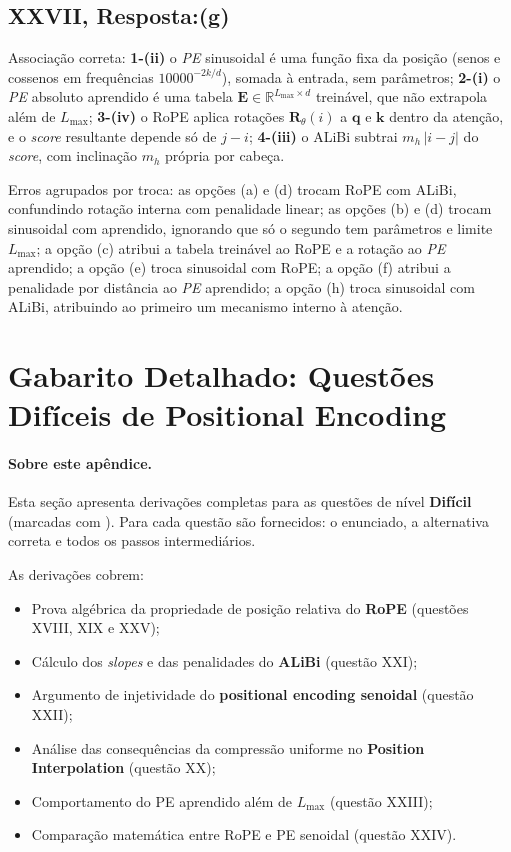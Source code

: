 \documentclass{dlproblemset}
\begin{document}
\subsection*{XXVII, Resposta:(g)}
Associação correta: \textbf{1-(ii)} o \textit{PE} sinusoidal é uma função fixa da
posição (senos e cossenos em frequências $10000^{-2k/d}$), somada à entrada, sem
parâmetros; \textbf{2-(i)} o \textit{PE} absoluto aprendido é uma tabela
$\mathbf{E} \in \mathbb{R}^{L_{\text{max}} \times d}$ treinável, que não extrapola além
de $L_{\text{max}}$; \textbf{3-(iv)} o RoPE aplica rotações $\mathbf{R}_\theta(i)$ a
$\mathbf{q}$ e $\mathbf{k}$ dentro da atenção, e o \textit{score} resultante depende só
de $j - i$; \textbf{4-(iii)} o ALiBi subtrai $m_h\,|i - j|$ do \textit{score}, com
inclinação $m_h$ própria por cabeça.

Erros agrupados por troca: as opções (a) e (d) trocam RoPE com ALiBi, confundindo
rotação interna com penalidade linear; as opções (b) e (d) trocam sinusoidal com
aprendido, ignorando que só o segundo tem parâmetros e limite $L_{\text{max}}$; a opção
(c) atribui a tabela treinável ao RoPE e a rotação ao \textit{PE} aprendido; a opção (e)
troca sinusoidal com RoPE; a opção (f) atribui a penalidade por distância ao
\textit{PE} aprendido; a opção (h) troca sinusoidal com ALiBi, atribuindo ao primeiro um
mecanismo interno à atenção.

\clearpage
\section*{Gabarito Detalhado: Questões Difíceis de Positional Encoding}

\paragraph{Sobre este apêndice.}
Esta seção apresenta derivações completas para as questões de nível \textbf{Difícil}
(marcadas com ).
Para cada questão são fornecidos: o enunciado, a alternativa correta e todos os
passos intermediários.

As derivações cobrem:
\begin{itemize}
  \item Prova algébrica da propriedade de posição relativa do \textbf{RoPE}
        (questões XVIII, XIX e XXV);
  \item Cálculo dos \textit{slopes} e das penalidades do \textbf{ALiBi} (questão XXI);
  \item Argumento de injetividade do \textbf{positional encoding senoidal} (questão XXII);
  \item Análise das consequências da compressão uniforme no \textbf{Position Interpolation}
        (questão XX);
  \item Comportamento do PE aprendido além de $L_{\max}$ (questão XXIII);
  \item Comparação matemática entre RoPE e PE senoidal (questão XXIV).
\end{itemize}
\end{document}
